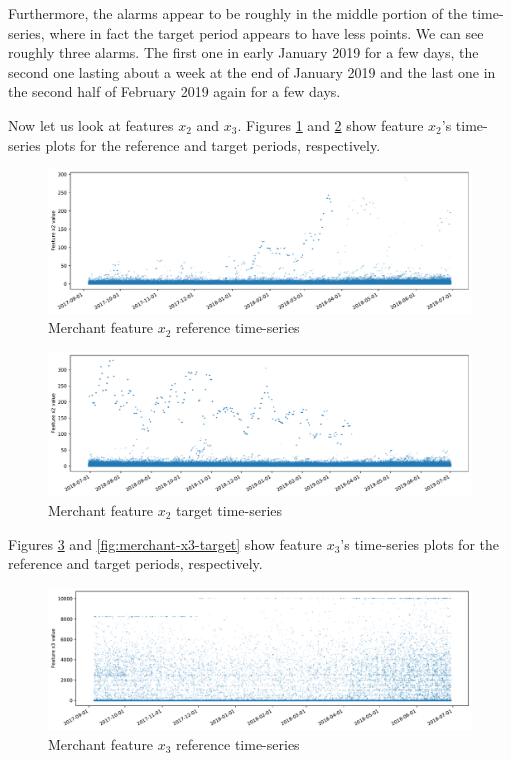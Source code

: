 \documentclass[sigconf]{acmart}
\begin{document}
Furthermore, the alarms appear to be roughly in the middle portion of the time-series, where in fact the target period appears to have less points. We can see roughly three alarms. The first one in early January 2019 for a few days, the second one lasting about a week at the end of January 2019 and the last one in the second half of February 2019 again for a few days.

Now let us look at features $x_2$ and $x_3$. Figures \ref{fig:merchant-x2-reference} and \ref{fig:merchant-x2-target} show feature $x_2$'s time-series plots for the reference and target periods, respectively.
\begin{figure}[!htb]
    \begin{center}
      \includegraphics[scale=0.25]{figures/merchant-x2-reference.pdf}
      \caption{Merchant feature $x_2$ reference time-series}
      \label{fig:merchant-x2-reference}
    \end{center}
\end{figure}
\begin{figure}[!htb]
    \begin{center}
      \includegraphics[scale=0.25]{figures/merchant-x2-target.pdf}
      \caption{Merchant feature $x_2$ target time-series}
      \label{fig:merchant-x2-target}
    \end{center}
\end{figure}
Figures \ref{fig:merchant-x3-reference} and \ref{fig:merchant-x3-target} show feature $x_3$'s time-series plots for the reference and target periods, respectively.
\begin{figure}[!htb]
    \begin{center}
      \includegraphics[scale=0.25]{figures/merchant-x3-reference.pdf}
      \caption{Merchant feature $x_3$ reference time-series}
      \label{fig:merchant-x3-reference}
    \end{center}
\end{figure}
\end{document}
